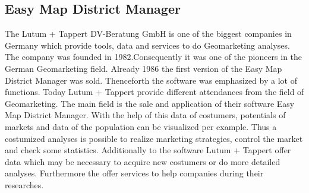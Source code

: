 \subsection{Easy Map District Manager}
The Lutum + Tappert DV-Beratung GmbH is one of the biggest companies in Germany which provide tools, data and services to do Geomarketing analyses. The company was founded in 1982.Consequently it was one of the pioneers in the German Geomarketing field. Already 1986 the first version of the Easy Map District Manager was sold. Thenceforth the software was emphasized by a lot of functions. Today Lutum + Tappert provide different attendances from the field of Geomarketing. The main field is the sale and application of their software Easy Map District Manager. With the help of this data of costumers, potentials of markets and data of the population can be visualized per example. Thus a costumized analyses is possible to realize marketing strategies, control the market and check some statistics. Additionally to the software Lutum + Tappert offer data which may be necessary to acquire new costumers or do more detailed analyses. Furthermore the offer services to help companies during their researches. \\
